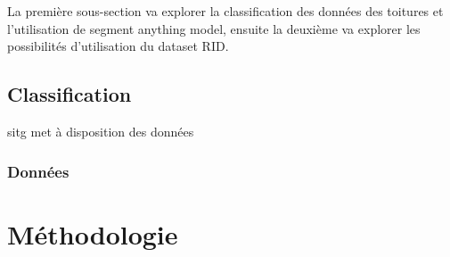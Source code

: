 La première sous-section va explorer la classification des données des toitures et l'utilisation de segment anything model, ensuite la deuxième va explorer les possibilités d'utilisation du dataset RID.

\subsection{Classification}
\acrshort{sitg} met à disposition des données 
\subsubsection{Données}


\section{Méthodologie}





